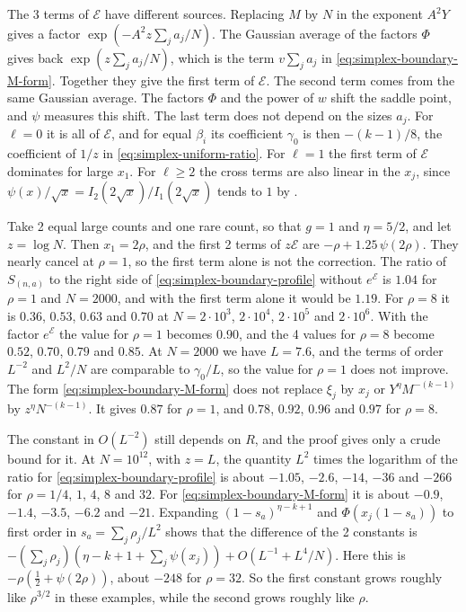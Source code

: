 \begin{remark}
The 3 terms of $\mathcal E$ have different sources. Replacing $M$ by $N$ in
the exponent $A^2Y$ gives a factor $\exp(-A^2z\sum_ja_j/N)$. The Gaussian
average of the factors $\Phi$ gives back $\exp(z\sum_ja_j/N)$, which is the
term $v\sum_ja_j$ in \eqref{eq:simplex-boundary-M-form}. Together they give
the first term of $\mathcal E$. The second term comes from the same
Gaussian average. The factors $\Phi$ and the power of $w$ shift the saddle
point, and $\psi$ measures this shift. The last term does not depend on the
sizes $a_j$. For $\ell=0$ it is all of $\mathcal E$, and for equal $\beta_i$
its coefficient $\gamma_0$ is then $-(k-1)/8$, the coefficient of $1/z$ in
\eqref{eq:simplex-uniform-ratio}. For $\ell=1$ the first term
of $\mathcal E$ dominates for large $x_1$. For $\ell\ge2$ the cross terms
are also linear in the $x_j$, since $\psi(x)/\sqrt x=I_2(2\sqrt x)/I_1(2\sqrt x)$
tends to $1$ by \cite[Eq.~10.40.1]{dlmf}.

Take 2 equal large counts and one rare count, so that $g=1$ and $\eta=5/2$,
and let $z=\log N$. Then $x_1=2\rho$, and the first 2 terms of
$z\mathcal E$ are $-\rho+1.25\,\psi(2\rho)$. They nearly cancel at
$\rho=1$, so the first term alone is not the correction. The ratio of
$S_{(n,a)}$ to the right side of \eqref{eq:simplex-boundary-profile}
without $e^{\mathcal E}$ is $1.04$ for $\rho=1$ and $N=2000$, and with the
first term alone it would be $1.19$. For $\rho=8$
it is $0.36$, $0.53$, $0.63$ and $0.70$ at $N=2\cdot10^3$, $2\cdot10^4$,
$2\cdot10^5$ and $2\cdot10^6$. With the factor $e^{\mathcal E}$ the value
for $\rho=1$ becomes $0.90$, and the 4 values for $\rho=8$ become $0.52$,
$0.70$, $0.79$ and $0.85$. At $N=2000$ we have $L=7.6$, and the terms of
order $L^{-2}$ and $L^2/N$ are comparable to $\gamma_0/L$, so the value for
$\rho=1$ does not improve. The form \eqref{eq:simplex-boundary-M-form} does
not replace $\xi_j$ by $x_j$ or $Y^\eta M^{-(k-1)}$ by $z^\eta N^{-(k-1)}$.
It gives $0.87$ for $\rho=1$, and $0.78$, $0.92$, $0.96$ and $0.97$ for
$\rho=8$.

The constant in $O(L^{-2})$ still depends on $R$, and the proof gives only
a crude bound for it. At
$N=10^{12}$, with $z=L$, the quantity $L^2$ times the logarithm of the ratio
for \eqref{eq:simplex-boundary-profile} is about $-1.05$, $-2.6$, $-14$,
$-36$ and $-266$ for $\rho=1/4$, $1$, $4$, $8$ and $32$. For
\eqref{eq:simplex-boundary-M-form} it is about $-0.9$, $-1.4$, $-3.5$,
$-6.2$ and $-21$. Expanding $(1-s_a)^{\eta-k+1}$ and $\Phi(x_j(1-s_a))$ to
first order in $s_a=\sum_j\rho_j/L^2$ shows that the difference of the 2
constants is
$-(\sum_j\rho_j)(\eta-k+1+\sum_j\psi(x_j))+O(L^{-1}+L^4/N)$. Here this
is $-\rho(\tfrac12+\psi(2\rho))$, about $-248$ for $\rho=32$. So the first
constant grows roughly like $\rho^{3/2}$ in these examples, while the
second grows roughly like $\rho$.


\end{remark}
